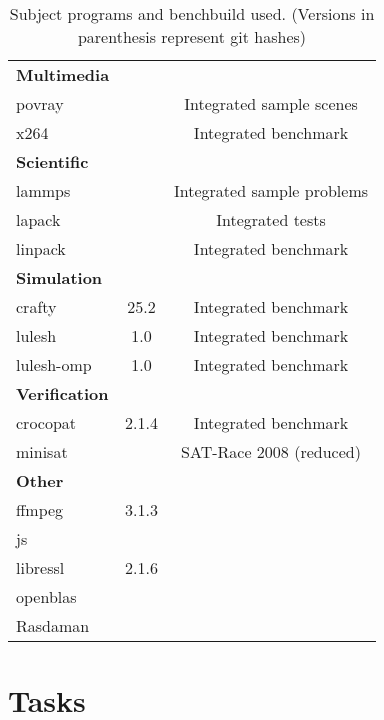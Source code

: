 \begin{table}[H]
\begin{tabularx}{\textwidth}{lcC}
        \midrule
        \textbf{Multimedia}\\
        povray &  & Integrated sample scenes\\
        x264 &  & Integrated benchmark\\
        \midrule
        \textbf{Scientific}\\
        lammps &  & Integrated sample problems\\
        lapack & & Integrated tests\\
        linpack & & Integrated benchmark\\
        \midrule
        \textbf{Simulation}\\
        crafty & 25.2 & Integrated benchmark\\
        lulesh & 1.0 & Integrated benchmark\\
        lulesh-omp & 1.0 & Integrated benchmark\\
        \midrule
        \textbf{Verification}\\
        crocopat & 2.1.4 & Integrated benchmark\\
        minisat &  & SAT-Race 2008 (reduced)\\
        \midrule
        \textbf{Other}\\
        ffmpeg & 3.1.3\\
        js\\
        libressl & 2.1.6\\
        openblas & \\
        Rasdaman & \\
        \bottomrule
    \end{tabularx}
    \caption[Subject programs]{Subject programs and benchbuild used. (Versions in parenthesis represent git hashes)}
\end{table}

\section{Tasks}

